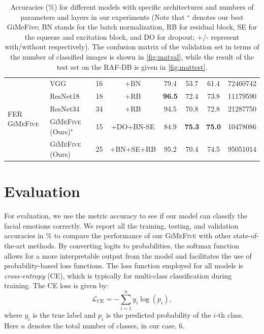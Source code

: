 \begin{table}[ht]
\begin{tabular}{@{}llcccccr@{}}
    \midrule
    \midrule
    \multirow{5}{*}{FER \textsc{GiMeFive}} & VGG~\cite{SimonyanZ14a} & 16 & +BN & 79.4 & 53.7 & 61.4 & 72460742 \\
    & ResNet18~\cite{HeZRS16} & 18 & +RB  & \textbf{96.5} & 72.4 & 73.8 & 11179590 \\
    & ResNet34~\cite{HeZRS16} & 34 & +RB  & 94.5 & 70.8 & 72.8 & 21287750 \\
    &\textsc{GiMeFive} (Ours)\textcolor{LMUGreen}{$^\star$} & 15 & +DO+BN-SE & 84.9 & \textbf{75.3} & \textbf{75.0} & 10478086 \\
    &\textsc{GiMeFive} (Ours) & 25 & +BN+SE+RB & 95.2 & 70.4 & 74.5 & 95051014 \\
    \bottomrule
  \end{tabular}
  \caption{Accuracies (\%) for different models with specific architectures and numbers of parameters and layers in our experiments 
  (Note that \textcolor{LMUGreen}{$^\star$} denotes our best GiMeFive; 
  BN stands for the batch normalization, 
  RB for residual block, 
  SE for the squeeze and excitation block, 
  and DO for dropout; 
  +/- represent with/without respectively). 
  The confusion matrix of the validation set in terms of the number of classified images is shown in \cref{fig:matval}, 
  while the result of the test set on the RAF-DB is given in \cref{fig:mattest}.} 
  \label{tab:model}
\end{table}

\section{Evaluation}
\label{sec:evaluation}

For evaluation, we use the metric accuracy to see if our model can classify the facial emotions correctly. 
We report all the training, testing, and validation accuracies in \% 
to compare the performance of our \textsc{GiMeFive} with other state-of-the-art methods. 
By converting logits to probabilities, 
the softmax function allows for a more interpretable output from the model and facilitates the use of probability-based loss functions. 
The loss function employed for all models is \textit{cross-entropy} (CE), 
which is typically for multi-class classification during training. 
The CE loss is given by: 
\begin{equation}
  \label{eq:ce}
  \mathcal{L}_{\text{CE}} = -\sum_{i=1}^{n} y_i \log(p_i),
\end{equation}
where $y_i$ is the true label and $p_i$ is the predicted probability of the $i$-th class. 
Here $n$ denotes the total number of classes, in our case, 6.

